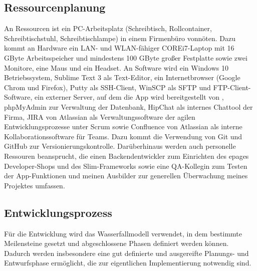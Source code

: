 \subsection{Ressourcenplanung}
\label{sec:Ressourcenplanung}

An Ressourcen ist ein PC-Arbeitsplatz (Schreibtisch, Rollcontainer, Schreibtischstuhl, Schreibtischlampe) in einem Firmenbüro vonnöten. Dazu kommt an Hardware ein LAN- und WLAN-fähiger COREi7-Laptop mit 16 GByte Arbeitsspeicher und mindestens 100 GByte großer Festplatte sowie zwei Monitore, eine Maus und ein Headset. An Software wird ein Windows 10 Betriebssystem, Sublime Text 3 als Text-Editor, ein Internetbrowser (Google Chrom und Firefox), Putty als \acs{SSH}-Client, Win\acs{SCP} als \acs{SFTP} und \acs{FTP}-Client-Software, ein externer Server, auf dem die App  wird bereitgestellt von , phpMyAdmin zur Verwaltung der Datenbank, HipChat als internes Chattool der Firma, JIRA von Atlassian als Verwaltungssoftware der agilen Entwicklungsprozesse unter Scrum sowie Confluence von Atlassian als interne Kollaborationssoftware für Teams. Dazu kommt die Verwendung von \acs{Git} und \acs{GitHub} zur Versionierungskontrolle. Darüberhinaus werden auch personelle Ressouren beansprucht, die einen Backendentwickler zum Einrichten des epages Developer-Shops und des Slim-Frameworks sowie eine \acs{QA}-Kollegin zum Testen der App-Funktionen und meinen Ausbilder zur generellen Überwachung meines Projektes umfassen.


\subsection{Entwicklungsprozess}
\label{sec:Entwicklungsprozess}

Für die Entwicklung wird das Wasserfallmodell verwendet, in dem bestimmte Meilensteine gesetzt und abgeschlossene Phasen definiert werden können. Dadurch werden insbesondere eine gut definierte und ausgereifte Planungs- und Entwurfsphase ermöglicht, die zur eigentlichen Implementierung notwendig sind. 
